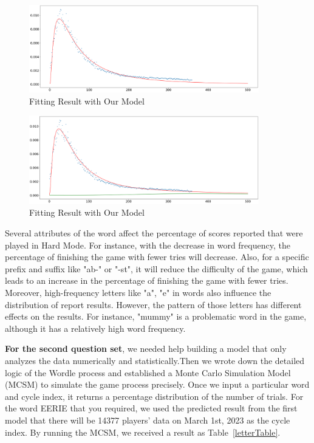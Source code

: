 \documentclass[12pt]{article}
\begin{document}
\begin{figure}[h]
    \centering
    \includegraphics[width=10cm]{figures/log-norm.png}
    \caption{Fitting Result with Our Model}
    \label{letterlog-norm}
\end{figure}

\begin{figure}[h]
    \centering
    \includegraphics[width=10cm]{figures/model1Add.png}
    \caption{Fitting Result with Our Model}
    \label{lettermodel1Add}
\end{figure}

\vspace{0.1cm}
\noindent
Several attributes of the word affect the percentage of scores reported that were played in Hard Mode. For instance, with the decrease in word frequency, the percentage of finishing the game with fewer tries will decrease. Also, for a specific prefix and suffix like "ab-" or "-st", it will reduce the difficulty of the game, which leads to an increase in the percentage of finishing the game with fewer tries. Moreover, high-frequency letters like "a", "e" in words also influence the distribution of report results.  However, the pattern of those letters has different effects on the results. For instance, "mummy" is a problematic word in the game, although it has a relatively high word frequency.

\vspace{0.1cm}
\noindent
\textbf{For the second question set}, we needed help building a model that only analyzes the data numerically and statistically.Then we wrote down the detailed logic of the Wordle process and established a Monte Carlo Simulation Model (MCSM) to simulate the game process precisely. Once we input a particular word and cycle index, it returns a percentage distribution of the number of trials. For the word EERIE that you required, we used the predicted result from the first model that there will be 14377 players’ data on March 1st, 2023 as the cycle index. By running the MCSM, we received a result as Table~\ref{letterTable}.
\end{document}
